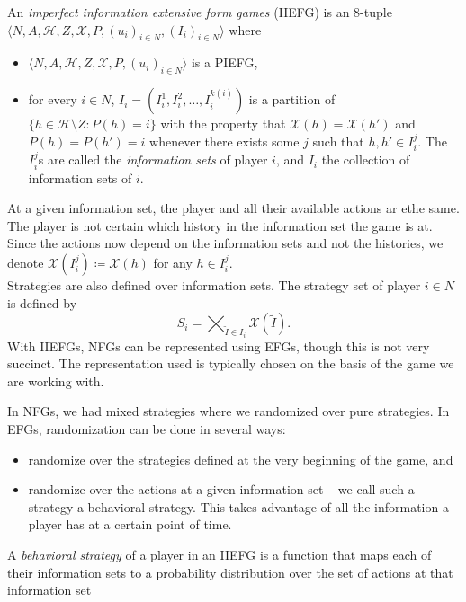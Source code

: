 	\begin{fdef}
		An \emph{imperfect information extensive form games} (IIEFG) is an $8$-tuple $\langle N,A,\mathcal{H},Z,\mathcal{X},P,(u_i)_{i\in N},(I_i)_{i \in N}\rangle$ where
		\begin{itemize}
			\item $\langle N,A,\mathcal{H},Z,\mathcal{X},P,(u_i)_{i\in N}\rangle$ is a PIEFG,
			\item for every $i \in N$, $I_i = (I_i^1,I_i^2,\ldots,I_i^{k(i)})$ is a partition of $\{ h \in \mathcal{H} \setminus Z : P(h) = i \}$ with the property that $\mathcal{X}(h) = \mathcal{X}(h')$ and $P(h) = P(h') = i$ whenever there exists some $j$ such that $h,h' \in I_i^j$. The $I_i^j$s are called the \emph{information sets} of player $i$, and $I_i$ the collection of information sets of $i$.
		\end{itemize}
	\end{fdef}

	At a given information set, the player and all their available actions ar ethe same. The player is not certain which history in the information set the game is at.\\
	Since the actions now depend on the information sets and not the histories, we denote $\mathcal{X}(I_i^j) \coloneqq \mathcal{X}(h)$ for any $h \in I_i^j$.\\
	Strategies are also defined over information sets. The strategy set of player $i \in N$ is defined by
	\[ S_i = \bigtimes_{\tilde{I} \in I_i} \mathcal{X}(\tilde{I}). \]
	With IIEFGs, NFGs can be represented using EFGs, though this is not very succinct. The representation used is typically chosen on the basis of the game we are working with.

	In NFGs, we had mixed strategies where we randomized over pure strategies. In EFGs, randomization can be done in several ways:
	\begin{itemize}
		\item randomize over the strategies defined at the very beginning of the game, and
		\item randomize over the actions at a given information set -- we call such a strategy a behavioral strategy. This takes advantage of all the information a player has at a certain point of time.
	\end{itemize}

	\begin{fdef}
		A \emph{behavioral strategy} of a player in an IIEFG is a function that maps each of their information sets to a probability distribution over the set of actions at that information set
	\end{fdef}

